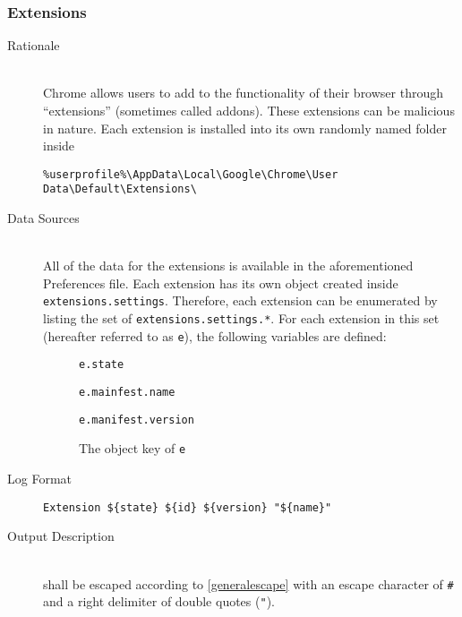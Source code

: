 \subsubsection{Extensions}
\begin{description}
\item[Rationale] \hfill \\
Chrome allows users to add to the functionality of their browser through
``extensions'' (sometimes called addons).  These extensions can be malicious in
nature.   Each extension is installed into its own randomly named folder inside
\vspace{-\baselineskip}
\begin{verbatim}
%userprofile%\AppData\Local\Google\Chrome\User Data\Default\Extensions\
\end{verbatim}
\item[Data Sources] \hfill \\
All of the data for the extensions is available in the aforementioned
Preferences file.  Each extension has its own object created inside
\texttt{extensions.settings}.  Therefore, each extension can be enumerated by
listing the set of \texttt{extensions.settings.*}.  For each extension in this
set (hereafter referred to as \texttt{e}), the following variables are defined:
\begin{description}
\item[] \texttt{e.state}
\item[] \texttt{e.mainfest.name}
\item[] \texttt{e.manifest.version}
\item[] The object key of \texttt{e}
\end{description}
\item[Log Format] \hfill 
\vspace{-\baselineskip}
\begin{verbatim}
Extension ${state} ${id} ${version} "${name}"
\end{verbatim}
\item[Output Description] \hfill \\
 shall be escaped according to \ref{generalescape} with an escape
character of \verb|#| and a right delimiter of double quotes (\verb|"|). 


\end{description}
